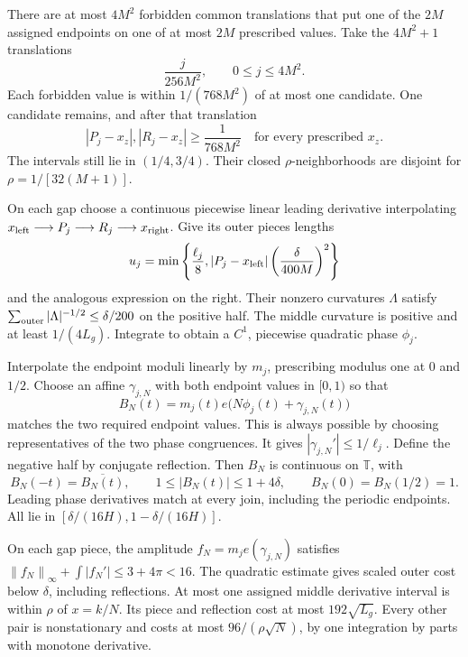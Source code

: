 \documentclass[11pt]{article}
\theoremstyle{remark}
\newcommand{\T}{\mathbb T}
\newcommand{\norm}[1]{\left\|#1\right\|}
\begin{document}
There are at most $4M^2$ forbidden common translations that put one of
the $2M$ assigned endpoints on one of at most $2M$ prescribed values.
Take the $4M^2+1$ translations
\[
 \frac{j}{256M^2},\qquad 0\le j\le4M^2.
\]
Each forbidden value is within $1/(768M^2)$ of at most one candidate.
One candidate remains, and after that translation
\begin{equation}\label{eq:avoidance}
 |P_j-x_z|, |R_j-x_z|\ge\frac1{768M^2}
 \quad\text{for every prescribed }x_z.
\end{equation}
The intervals still lie in $(1/4,3/4)$. Their closed $\rho$-neighborhoods
are disjoint for $\rho=1/[32(M+1)]$.

On each gap choose a continuous piecewise linear leading derivative
interpolating
$x_{\rm left}\longrightarrow P_j\longrightarrow R_j
\longrightarrow x_{\rm right}$. Give its outer pieces lengths
\begin{equation}\label{eq:outer-length}
 u_j=\min\left\{\frac{\ell_j}{8},
             |P_j-x_{\rm left}|\left(\frac{\delta}{400M}\right)^2\right\}
\end{equation}
and the analogous expression on the right. Their nonzero curvatures
$\Lambda$ satisfy
$\sum_{\rm outer}|\Lambda|^{-1/2}\le\delta/200$ on the positive half.
The middle curvature is positive and at least $1/(4L_g)$.
Integrate to obtain a $C^1$, piecewise quadratic phase $\phi_j$.

Interpolate the endpoint moduli linearly by $m_j$, prescribing modulus
one at $0$ and $1/2$. Choose an affine $\gamma_{j,N}$ with both endpoint
values in $[0,1)$ so that
\[
 B_N(t)=m_j(t)e\bigl(N\phi_j(t)+\gamma_{j,N}(t)\bigr)
\]
matches the two required endpoint values. This is always possible by
choosing representatives of the two phase congruences. It gives
$|\gamma_{j,N}'|\le1/\ell_j$. Define the negative half by conjugate
reflection. Then $B_N$ is continuous on $\T$, with
\begin{equation}\label{eq:BN-modulus}
 B_N(-t)=\overline{B_N(t)},\qquad
 1\le|B_N(t)|\le1+4\delta,\qquad B_N(0)=B_N(1/2)=1.
\end{equation}
Leading phase derivatives match at every join, including the periodic
endpoints. All lie in
$[\delta/(16H),1-\delta/(16H)]$.

On each gap piece, the amplitude $f_N=m_je(\gamma_{j,N})$ satisfies
$\norm{f_N}_\infty+\int|f_N'|\le3+4\pi<16$.
The quadratic estimate gives scaled outer cost below $\delta$, including
reflections. At most one assigned middle derivative interval is within
$\rho$ of $x=k/N$. Its piece and reflection cost at most $192\sqrt{L_g}$.
Every other pair is nonstationary and costs at most
$96/(\rho\sqrt N)$, by one integration by parts with monotone derivative.
\end{document}
